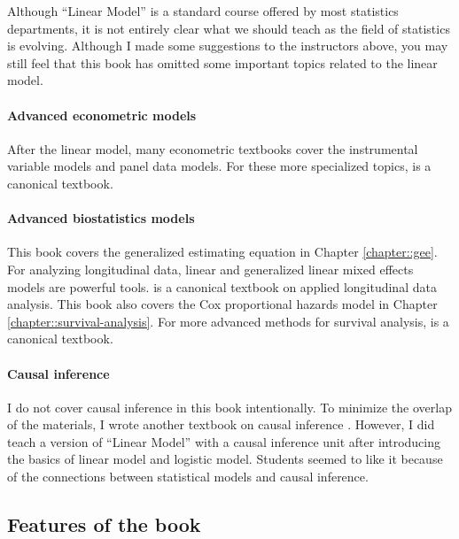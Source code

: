 Although ``Linear Model'' is a standard course offered by most statistics departments, it is not entirely clear what we should teach as the field of statistics is evolving. Although I made some suggestions to the instructors above, you may still feel that this book has omitted some important topics related to the linear model.   




\paragraph*{Advanced econometric models}
After the linear model, many econometric textbooks cover the instrumental variable models and panel data models. For these more specialized topics, \citet{wooldridge2010econometric} is a canonical textbook. 




\paragraph*{Advanced biostatistics models}
This book covers the generalized estimating equation in Chapter \ref{chapter::gee}. For analyzing longitudinal data, linear and generalized linear mixed effects models are powerful tools. \citet{fitzmaurice2012applied} is a canonical textbook on applied longitudinal data analysis.  
This book also covers the Cox proportional hazards model in Chapter \ref{chapter::survival-analysis}. For more advanced methods for survival analysis, \citet{kalbfleisch2011statistical} is a canonical textbook. 



\paragraph*{Causal inference}
I do not cover causal inference in this book intentionally. To minimize the overlap of the materials, I wrote another textbook on causal inference \citep{ding2023first}. However, I did teach a version of ``Linear Model'' with a causal inference unit after introducing the basics of linear model and logistic model. Students seemed to like it because of the connections between statistical models and causal inference. 



 

\subsection*{Features of the book}

